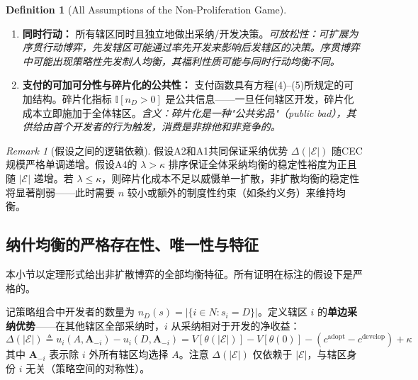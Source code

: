 \documentclass[12pt,a4paper]{ctexart}
\theoremstyle{definition}
\newtheorem{definition}{Definition}[section]
\theoremstyle{remark}
\newtheorem{remark}{Remark}[section]
\begin{document}
\begin{definition}[All Assumptions of the Non-Proliferation Game]
\begin{enumerate}[label=\textbf{A\arabic*}, leftmargin=*, itemsep=4pt]
\item \textbf{同时行动：} 所有辖区同时且独立地做出采纳/开发决策。\hfill\textit{可放松性：可扩展为序贯行动博弈，先发辖区可能通过率先开发来影响后发辖区的决策。序贯博弈中可能出现策略性先发制人均衡，其福利性质可能与同时行动均衡不同。}

\item \textbf{支付的可加可分性与碎片化的公共性：} 支付函数具有方程(4)--(5)所规定的可加结构。碎片化指标 $\mathbb{I}[n_D > 0]$ 是公共信息——一旦任何辖区开发，碎片化成本立即施加于全体辖区。\hfill\textit{含义：碎片化是一种"公共劣品"（public bad），其供给由首个开发者的行为触发，消费是非排他和非竞争的。}
\end{enumerate}
\end{definition}

\begin{remark}[假设之间的逻辑依赖]
假设A2和A1共同保证采纳优势 $\Delta(|\mathcal{E}|)$ 随CEC规模严格单调递增。假设A4的 $\lambda > \kappa$ 排序保证全体采纳均衡的稳定性裕度为正且随 $|\mathcal{E}|$ 递增。若 $\lambda \leq \kappa$，则碎片化成本不足以威慑单一扩散，非扩散均衡的稳定性将显著削弱——此时需要 $n$ 较小或额外的制度性约束（如条约义务）来维持均衡。
\end{remark}

\subsection{纳什均衡的严格存在性、唯一性与特征}

本小节以定理形式给出非扩散博弈的全部均衡特征。所有证明在标注的假设下是严格的。

记策略组合中开发者的数量为 $n_D(s) = |\{i \in N : s_i = D\}|$。定义辖区 $i$ 的\textbf{单边采纳优势}——在其他辖区全部采纳时，$i$ 从采纳相对于开发的净收益：
\begin{equation}
\Delta(|\mathcal{E}|) \triangleq u_i(A, \mathbf{A}_{-i}) - u_i(D, \mathbf{A}_{-i}) = V[\theta(|\mathcal{E}|)] - V[\theta(0)] - (c^{\text{adopt}} - c^{\text{develop}}) + \kappa
\label{eq:adoption-advantage-def}
\end{equation}
其中 $\mathbf{A}_{-i}$ 表示除 $i$ 外所有辖区均选择 $A$。注意 $\Delta(|\mathcal{E}|)$ 仅依赖于 $|\mathcal{E}|$，与辖区身份 $i$ 无关（策略空间的对称性）。
\end{document}
